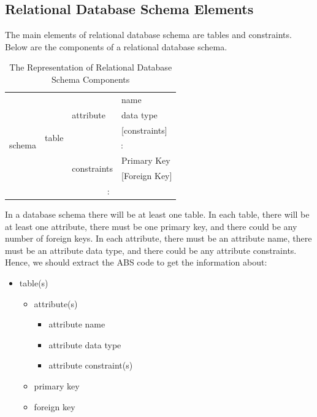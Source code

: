 \documentclass[runningheads,a4paper]{llncs}
\begin{document}
\subsection{Relational Database Schema Elements}
The main elements of relational database schema are tables and constraints. Below are the components of a relational database schema.

\begin{table}[]
	\centering
	\caption{ The Representation of Relational Database Schema Components}
	\label{my-label}
	\begin{tabular}{|l|l|l|l|}
		\hline
		\multirow{9}{*}{schema} & \multirow{7}{*}{table} & \multirow{3}{*}{attribute}   & name              \\ \cline{4-4} 
		&                        &                              & data type         \\ \cline{4-4} 
		&                        &                              & {[}constraints{]} \\ \cline{3-4} 
		&                        & \multicolumn{2}{c|}{\multirow{2}{*}{:}}          \\
		&                        & \multicolumn{2}{c|}{}                            \\ \cline{3-4} 
		&                        & \multirow{2}{*}{constraints} & Primary Key       \\ \cline{4-4} 
		&                        &                              & {[}Foreign Key{]} \\ \cline{2-4} 
		& \multicolumn{3}{c|}{\multirow{2}{*}{:}}                                   \\
		& \multicolumn{3}{c|}{}                                                     \\ \hline
	\end{tabular}
\end{table}

In a database schema there will be at least one table. In each table, there will be at least one attribute, there must be one primary key, and there could be any number of foreign keys. In each attribute, there must be an attribute name, there must be an attribute data type, and there could be any attribute constraints. Hence, we should extract the ABS code to get the information about:

\begin{itemize}
	\item table(s)
	\begin{itemize}	
		\item attribute(s)
			\begin{itemize}
				\item attribute name
				\item attribute data type
				\item attribute constraint(s)
			\end{itemize}
		\item primary key
		\item foreign key
	\end{itemize}
\end{itemize}
\end{document}
